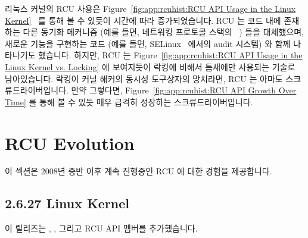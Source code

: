 리눅스 커널의 RCU 사용은
Figure~\ref{fig:app:rcuhist:RCU API Usage in the Linux Kernel}~\cite{PaulEMcKenneyRCUusagePage}
를 통해 볼 수 있듯이 시간에 따라 증가되었습니다.
RCU 는 코드 내에 존재하는 다른 동기화 메커니즘 (예를 들면, 네트워킹 프로토콜
스택의 ~\cite{Molnar00a,Torvalds2.5.69,Torvalds2.5.70}) 들을
대체했으며, 새로운 기능을 구현하는 코드 (예를 들면,
SELinux~\cite{JamesMorris04b} 에서의 audit 시스템) 와 함께 나타나기도 했습니다.
하지만, RCU 는
Figure~\ref{fig:app:rcuhist:RCU API Usage in the Linux Kernel vs. Locking} 에
보여지듯이 락킹에 비해서 틈새에만 사용되는 기술로 남아있습니다.
락킹이 커널 해커의 동시성 도구상자의 망치라면, RCU 는 아마도
스크류드라이버입니다.
만약 그렇다면,
Figure~\ref{fig:app:rcuhist:RCU API Growth Over Time} 를 통해 볼 수 있듯 매우
급격히 성장하는 스크류드라이버입니다.

\section{RCU Evolution}
\label{sec:app:rcuhist:RCU Evolution}

이 섹션은 2008년 중반 이후 계속 진행중인 RCU 에 대한 경험을 제공합니다.

\subsection{2.6.27 Linux Kernel}

이 릴리즈는
,
, 그리고
 RCU API 멤버를 추가했습니다.
\iffalse

